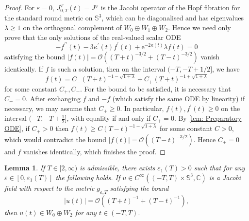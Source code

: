 \documentclass{article}
\numberwithin{equation}{section}        %
\theoremstyle{bfnote}
\newtheorem{lem}[thm]{Lemma}                %
\theoremstyle{definition}
\theoremstyle{bfremark}
\newcommand{\C}{\mathbb{C}}                 %
\newcommand{\Sp}{\mathbb{S}}                %
\begin{document}
\begin{proof}
    For $\varepsilon = 0$, $J^\varphi_{0,T}(t) = J^\varphi$ is the Jacobi operator of the Hopf fibration for the standard round metric on $\Sp^3$, which can be diagonalised and has eigenvalues $\lambda \geq 1$ on the orthogonal complement of $W_0 \oplus W_1 \oplus W_2$. Hence we need only prove that the only solutions of the real-valued scalar ODE
    \begin{equation*}
        - f^{\prime\prime}(t) - 3 \kappa^\prime(t) f^\prime(t) + \mathrm{e}^{-2\kappa(t)}\lambda f(t) = 0
    \end{equation*}
    satisfying the bound $|f(t)| = \mathcal{O}((T+t)^{-3/2} + (T-t)^{-3/2})$ vanish identically. If $f$ is such a solution, then on the interval $(-T,-T+1/2]$, we have
    \begin{equation*}
        f(t) = C_- (T+t)^{-1-\sqrt{1+\lambda}} + C_+ (T+t)^{-1+\sqrt{1+\lambda}}
    \end{equation*}
    for some constant $C_+,C_-$. For the bound to be satisfied, it is necessary that $C_-=0$. After exchanging $f$ and $-f$ (which satisfy the same ODE by linearity) if necessary, we may assume that $C_+ \geq 0$. In particular, $f(t), f^\prime(t) \geq 0$ on the interval $(-T,-T+\frac{1}{2}]$, with equality if and only if $C_+ = 0$. By \cref{lem: Preparatory ODE}, if $C_+ > 0$ then $f(t) \geq C (T-t)^{-1 - \sqrt{1+\lambda}}$ for some constant $C > 0$, which would contradict the bound $|f(t)| = \mathcal{O}((T-t)^{-3/2})$. Hence $C_+ = 0$ and $f$ vanishes identically, which finishes the proof.
\end{proof}

\begin{lem}     \label{lem: rule out W_1}
    If $T \in [2,\infty)$ is admissible, there exists $\varepsilon_1(T) > 0$ such that for any $\varepsilon \in [0,\varepsilon_1(T)]$ the following holds. If $u \in C^\infty((-T,T) \times \Sp^3,\C)$ is a Jacobi field with respect to the metric $g_{\varepsilon,T}$ satisfying the bound 
    \begin{equation*}
        |u(t)| = \mathcal{O}((T+t)^{-1}+(T-t)^{-1}) ,
    \end{equation*}
    then $u(t) \in W_0 \oplus W_2$ for any $t \in (-T,T)$.
\end{lem}
\end{document}
